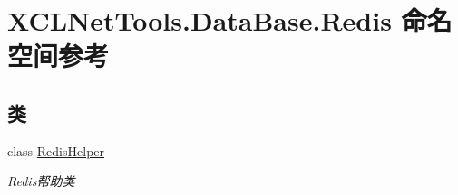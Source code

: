\hypertarget{namespace_x_c_l_net_tools_1_1_data_base_1_1_redis}{}\section{X\+C\+L\+Net\+Tools.\+Data\+Base.\+Redis 命名空间参考}
\label{namespace_x_c_l_net_tools_1_1_data_base_1_1_redis}
\subsection*{类}
\begin{DoxyCompactItemize}
\item 
class \hyperlink{class_x_c_l_net_tools_1_1_data_base_1_1_redis_1_1_redis_helper}{Redis\+Helper}
\begin{DoxyCompactList}\small\item\em Redis帮助类 \end{DoxyCompactList}\end{DoxyCompactItemize}
